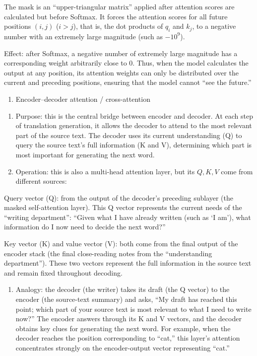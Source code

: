 The mask is an ``upper-triangular matrix'' applied after attention scores are calculated but before Softmax. It forces the attention scores for all future positions \((i,j)\) (\(i>j\)), that is, the dot products of \(q_i\) and \(k_j\), to a negative number with an extremely large magnitude (such as \(-10^9\)).

Effect: after Softmax, a negative number of extremely large magnitude has a corresponding weight arbitrarily close to 0. Thus, when the model calculates the output at any position, its attention weights can only be distributed over the current and preceding positions, ensuring that the model cannot ``see the future.''

\begin{enumerate}
\def\labelenumi{\arabic{enumi}.}
\setcounter{enumi}{1}
\tightlist
\item
  Encoder--decoder attention / cross-attention
\end{enumerate}

\begin{enumerate}
\def\labelenumi{(\arabic{enumi})}
\item
  Purpose: this is the central bridge between encoder and decoder. At each step of translation generation, it allows the decoder to attend to the most relevant part of the source text. The decoder uses its current understanding (Q) to query the source text's full information (K and V), determining which part is most important for generating the next word.
\item
{}
  Operation: this is also a multi-head attention layer, but its \(Q,K,V\) come from different sources:
\end{enumerate}

Query vector (Q): from the output of the decoder's preceding sublayer (the masked self-attention layer). This Q vector represents the current needs of the ``writing department'': ``Given what I have already written (such as `I am'), what information do I now need to decide the next word?''

Key vector (K) and value vector (V): both come from the final output of the encoder stack (the final close-reading notes from the ``understanding department''). These two vectors represent the full information in the source text and remain fixed throughout decoding.

\begin{enumerate}
\def\labelenumi{(\arabic{enumi})}
\setcounter{enumi}{2}
\tightlist
\item
  Analogy: the decoder (the writer) takes its draft (the Q vector) to the encoder (the source-text summary) and asks, ``My draft has reached this point; which part of your source text is most relevant to what I need to write now?'' The encoder answers through its K and V vectors, and the decoder obtains key clues for generating the next word. For example, when the decoder reaches the position corresponding to ``cat,'' this layer's attention concentrates strongly on the encoder-output vector representing ``cat.''
\end{enumerate}

